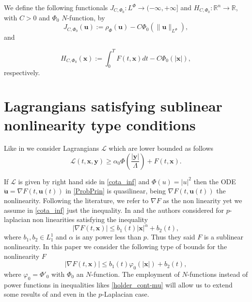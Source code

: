\documentclass[twoside]{article}
\theoremstyle{remark}
\newcommand{\orlnor}{\|_{L^{\Phi}}}
\newcommand{\lphi}{L^{\Phi}}
\renewcommand{\b}[1]{\boldsymbol{#1}}
\newcommand{\rr}{\mathbb{R}}
\renewcommand{\leq}{\leqslant}
\renewcommand{\geq}{\geqslant}
\begin{document}
We define the following  functionals $J_{C,\Phi_0}:\lphi\to (-\infty,+\infty]$ and $  H_{C,\Phi_0}:\rr^n\to \rr$, with $C>0$ and $\Phi_0$ $N$-function, by
\begin{equation}\label{func_phi}
  J_{C,\Phi_0}(\b{u}):= \rho_{\Phi}\left(\b{u}\right)-C\Phi_0\left(\|\b{u}\orlnor\right),
\end{equation}
 and

\begin{equation}\label{eq:functional_H-bis}
 H_{C,\Phi_0}(\b{x}):=\int_0^TF(t,\b{x})dt-C\Phi_0(|\b{x}|),
\end{equation}
respectively.





\section{Lagrangians satisfying  sublinear nonlinearity type conditions}


Like in \cite{ABGMS2015} we consider Lagrangians $\mathcal{L}$ which are lower bounded as follows 
\begin{equation}\label{cota_inf}
\mathcal{L}(t,\b{x},\b{y})\geq \alpha_0\Phi\left(\frac{|\b{y}|}{\Lambda}\right)+ F(t,\b{x}).
\end{equation}

If $\mathcal{L}$ is given by right hand side in \eqref{cota_inf} and $\Phi(u)=|u|^2$ then the ODE $\ddot{\b{u}}=\nabla F(t,\b{u}(t))$ in \eqref{ProbPrin}  is quasilinear,  being  $\nabla F(t,\b{u}(t))$ the nonlinearity. Following the literature, we refer to $\nabla F$ as the non linearity yet we assume in \eqref{cota_inf} just the inequality. In \cite{tang1998periodic} and \cite{tang2010periodic} the authors considered for $p$-laplacian non linearities satisfying the inequality
\[ |\nabla F(t,\b{x})|\leq b_1(t)|\b{x}|^{\alpha}+b_2(t),\]
where  $b_1,b_2 \in L^1_1$ and $\alpha$ is any power less than $p$. Thus they said $F$ is a sublinear nonlinearity. In this paper we consider the following type of bounds for the nonlinearity $F$
\begin{equation}\label{holder_cont-mu}
  \left| \nabla F(t,\b{x}) \right|\leq b_1(t)\varphi_0(|\b{x}|)+b_2(t),
\end{equation}
where $\varphi_0=\Phi'_0$ with $\Phi_0$ an $N$-function. The employment of  $N$-functions instead of power functions in  inequalities likes  \eqref{holder_cont-mu}  will allow us to extend some results of   \cite{tang1998periodic} and \cite{tang2010periodic} even in the $p$-Laplacian case.
\end{document}
